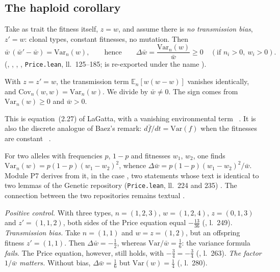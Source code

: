 \subsection{The haploid corollary}
\begin{corollary}\label{ch4:cor:haploide}
Take as trait the fitness itself, $z=w$, and assume there is \emph{no transmission
bias}, $z'=w$: clonal types, constant fitnesses, no mutation. Then
\[
\bar w\,(\bar w'-\bar w)=\mathrm{Var}_n(w),\qquad\text{hence}\qquad \Delta\bar w=\frac{\mathrm{Var}_n(w)}{\bar w}\ge0
\quad(\text{if }n_i>0,\ w_i>0).
\]
\tierA{} (, , ,
, \texttt{Price.lean}, ll.~125--185;  is re-exported under the name ).
\end{corollary}

\begin{humanproof}
With $z=z'=w$, the transmission term $\mathbb E_n[w(w-w)]$ vanishes identically, and
$\mathrm{Cov}_n(w,w)=\mathrm{Var}_n(w)$. We divide by $\bar w\ne0$. The sign comes from $\mathrm{Var}_n(w)\ge0$ and
$\bar w>0$.
\end{humanproof}

This is equation~(2.27) of LaGatta, with a vanishing environmental term \tierL{}~\cite{ch4:LaG}. It is also
the discrete analogue of Baez's remark: $d\bar f/dt=\mathrm{Var}(f)$ when the fitnesses are
constant \tierL{}~\cite{ch4:Bae}.

For two alleles with frequencies $p$, $1-p$ and fitnesses $w_1$, $w_2$, one finds
$\mathrm{Var}_n(w)=p(1-p)(w_1-w_2)^2$, whence $\Delta\bar w=p(1-p)(w_1-w_2)^2/\bar w$. Module P7 derives from it, in
the case , two statements whose text is identical to two lemmas of the Genetic repository
(\texttt{Price.lean}, ll.~224 and 235)
\tierA. The connection between the two repositories remains textual \tierC.

\begin{remark}
\emph{Positive control.} With three types, $n=(1,2,3)$, $w=(1,2,4)$, $z=(0,1,3)$ and $z'=(1,1,2)$, both sides
of the Price equation equal $-\frac{13}{36}$ (, l.~249).
\emph{Transmission bias.} Take $n=(1,1)$ and $w=z=(1,2)$, but an offspring fitness
$z'=(1,1)$. Then $\Delta\bar w=-\frac12$, whereas $\mathrm{Var}/\bar w=\frac16$: the variance formula
\emph{fails}. The Price equation, however, still holds, with $-\frac34=-\frac34$ (,
l.~263).
\emph{The factor $1/\bar w$ matters.} Without bias, $\Delta\bar w=\frac16$ but $\mathrm{Var}(w)=\frac14$
(, l.~280).
\end{remark}

